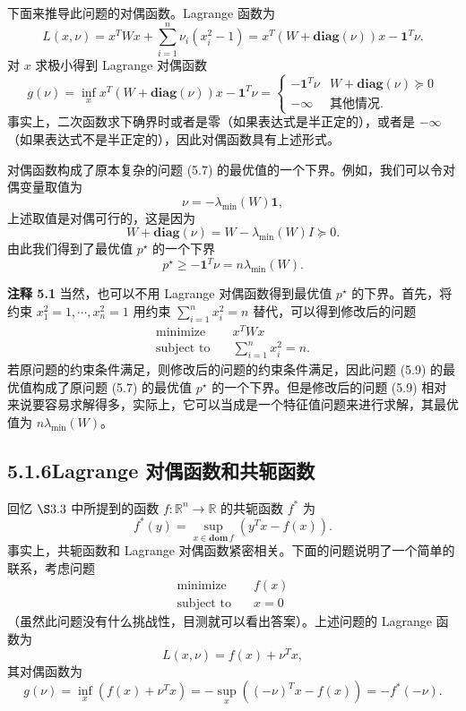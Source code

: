 \documentclass[UTF8,12pt,a4paper,fontset=fandol]{ctexart}
\begin{document}
下面来推导此问题的对偶函数。Lagrange 函数为
\[
L(x,\nu)=x^TWx+\sum_{i=1}^n \nu_i(x_i^2-1)
=x^T(W+\mathbf{diag}(\nu))x-\mathbf{1}^T\nu.
\]
对 $x$ 求极小得到 Lagrange 对偶函数
\[
g(\nu)=\inf_x x^T(W+\mathbf{diag}(\nu))x-\mathbf{1}^T\nu
=
\begin{cases}
-\mathbf{1}^T\nu & W+\mathbf{diag}(\nu)\succeq 0\\
-\infty & \text{其他情况}.
\end{cases}
\]
事实上，二次函数求下确界时或者是零（如果表达式是半正定的），或者是 $-\infty$（如果表达式不是半正定的），因此对偶函数具有上述形式。

对偶函数构成了原本复杂的问题 (5.7) 的最优值的一个下界。例如，我们可以令对偶变量取值为
\[
\nu=-\lambda_{\min}(W)\mathbf{1},
\]
上述取值是对偶可行的，这是因为
\[
W+\mathbf{diag}(\nu)=W-\lambda_{\min}(W)I\succeq 0.
\]
由此我们得到了最优值 $p^\star$ 的一个下界
\begin{equation}
p^\star\geq -\mathbf{1}^T\nu=n\lambda_{\min}(W).
\tag{5.8}
\end{equation}

\noindent\textbf{注释 5.1}\quad
当然，也可以不用 Lagrange 对偶函数得到最优值 $p^\star$ 的下界。首先，将约束 $x_1^2=1,\cdots,x_n^2=1$ 用约束 $\sum_{i=1}^n x_i^2=n$ 替代，可以得到修改后的问题
\begin{equation}
\begin{aligned}
\text{minimize}\quad & x^T W x\\
\text{subject to}\quad & \sum_{i=1}^n x_i^2=n.
\end{aligned}
\tag{5.9}
\end{equation}
若原问题的约束条件满足，则修改后的问题的约束条件满足，因此问题 (5.9) 的最优值构成了原问题 (5.7) 的最优值 $p^\star$ 的一个下界。但是修改后的问题 (5.9) 相对来说要容易求解得多，实际上，它可以当成是一个特征值问题来进行求解，其最优值为 $n\lambda_{\min}(W)$。

\subsection*{5.1.6\quad Lagrange 对偶函数和共轭函数}

回忆 $\S 3.3$ 中所提到的函数 $f:\mathbb{R}^n\to\mathbb{R}$ 的共轭函数 $f^\ast$ 为
\[
f^\ast(y)=\sup_{x\in\mathbf{dom}\,f}(y^Tx-f(x)).
\]
事实上，共轭函数和 Lagrange 对偶函数紧密相关。下面的问题说明了一个简单的联系，考虑问题
\[
\begin{aligned}
\text{minimize}\quad & f(x)\\
\text{subject to}\quad & x=0
\end{aligned}
\]
（虽然此问题没有什么挑战性，目测就可以看出答案）。上述问题的 Lagrange 函数为
\[
L(x,\nu)=f(x)+\nu^Tx,
\]
其对偶函数为
\[
g(\nu)=\inf_x(f(x)+\nu^Tx)
=-\sup_x((- \nu)^Tx-f(x))
=-f^\ast(-\nu).
\]
\end{document}
